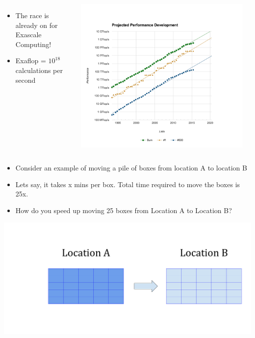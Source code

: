 \documentclass[10pt,t]{beamer}
\begin{document}
\begin{frame}[allowframebreaks,c]
\begin{itemize}
\begin{columns}[c]
\begin{itemize}
      \item The race is already on for Exascale Computing!
      \item[] Exaflop = $10^{18}$ calculations per second
      \end{itemize}
      \includegraphics[width=0.95\textwidth]{./top500}
    \end{columns}
  \end{itemize}
\end{frame}

\begin{frame}
  \vspace{1cm}
  \begin{itemize}
  \item Consider an example of moving a pile of boxes from location A to location B
  \item Lets say, it takes x mins per box. Total time required to move the boxes is 25x.
  \item How do you speed up moving 25 boxes from Location A to Location B?
  \end{itemize}
  \includegraphics[width=\textwidth,clip=true]{./Serial}
\end{frame}
\end{document}
